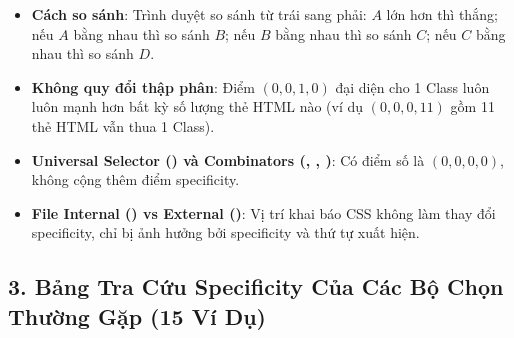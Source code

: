 \begin{noteBox}
\begin{itemize}[leftmargin=1.5em, itemsep=3pt, parsep=0pt]
    \item \textbf{Cách so sánh}: Trình duyệt so sánh từ trái sang phải: $A$ lớn hơn thì thắng; nếu $A$ bằng nhau thì so sánh $B$; nếu $B$ bằng nhau thì so sánh $C$; nếu $C$ bằng nhau thì so sánh $D$.
    \item \textbf{Không quy đổi thập phân}: Điểm $(0,0,1,0)$ đại diện cho 1 Class luôn luôn mạnh hơn bất kỳ số lượng thẻ HTML nào (ví dụ $(0,0,0,11)$ gồm 11 thẻ HTML vẫn thua 1 Class).
    \item \textbf{Universal Selector (\codeinline{*}) và Combinators (\codeinline{>}, \codeinline{+}, \codeinline{\~{}})}: Có điểm số là $(0,0,0,0)$, không cộng thêm điểm specificity.
    \item \textbf{File Internal () vs External ()}: Vị trí khai báo CSS không làm thay đổi specificity, chỉ bị ảnh hưởng bởi specificity và thứ tự xuất hiện.
\end{itemize}
\end{noteBox}

\subsection{3. Bảng Tra Cứu Specificity Của Các Bộ Chọn Thường Gặp (15 Ví Dụ)}

